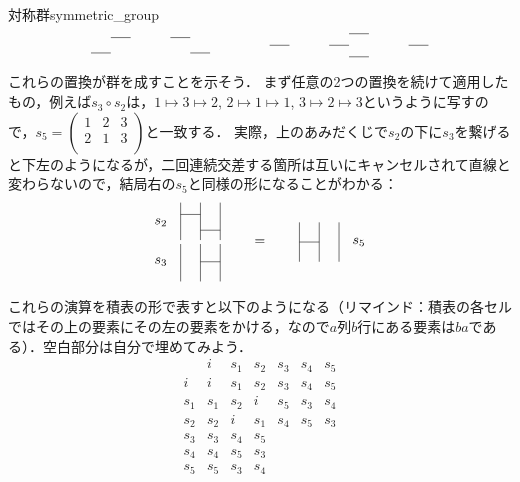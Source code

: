 \documentclass[11pt,a4paper, dvipdfmx]{jsarticle}
\begin{document}
\begin{rei}{対称群}{symmetric_group}
\[\begin{tikzpicture}
        \draw (0,.3) -- (.5,.3);
        \draw (.5,.7) -- (1,.7);
        \draw (2,.7) -- (2.5,.7);
        \draw (2.5,.3) -- (3,.3);
        \draw (4.5,.5) -- (5,.5);
        \draw (7,.8) -- (6.5,.8);
        \draw (6,.5) -- (6.5,.5);
        \draw (7,.2) -- (6.5,.2);
        \draw (8,.5) -- (8.5,.5);
    \end{tikzpicture}\]    

    これらの置換が群を成すことを示そう．
    まず任意の2つの置換を続けて適用したもの，例えば$s_3 \circ s_2$は，$1\mapsto3\mapsto2$, $2\mapsto1\mapsto1$, $3\mapsto2\mapsto3$というように写すので，$ s_5 = 
    \left( \begin{smallmatrix}
        1 & 2 & 3 \\
        2 & 1 & 3 \\
    \end{smallmatrix} \right)$と一致する．
    実際，上のあみだくじで$s_2$の下に$s_3$を繋げると下左のようになるが，二回連続交差する箇所は互いにキャンセルされて直線と変わらないので，結局右の$s_5$と同様の形になることがわかる：
    \[\begin{tikzpicture}
        \draw (0,0) -- (0,0.95);\draw (0,1.05) -- (0,2);
        \draw (.5,0) -- (.5,0.95);\draw (.5,1.05) -- (.5,2);
        \draw (1,0) -- (1,0.95);\draw (1,1.05) -- (1,2);

        \node (s2) at (-.5,1.5) {$s_2$};
        \node (s3) at (-.5,.5) {$s_3$};
        \draw (0,1.7) -- (.5,1.7);
        \draw (.5,1.3) -- (1,1.3);
        \draw (.5,.5) -- (1,.5);

        \node (eq) at (2,1) {$=$};

        \node (s5) at (4.5,1) {$s_5$};
        \draw (3,.5) -- (3,1.5);
        \draw (3.5,.5) -- (3.5,1.5);
        \draw (4,.5) -- (4,1.5);
        \draw (3,1) -- (3.5,1);
    \end{tikzpicture}\] 


    これらの演算を積表の形で表すと以下のようになる（リマインド：積表の各セルではその上の要素にその左の要素をかける，なので$a$列$b$行にある要素は$ba$である）．空白部分は自分で埋めてみよう．
    \[
        \begin{array}{c|cccccc}
               & i & s_1 & s_2 & s_3 & s_4 & s_5 \\ \hline
               i & i & s_1 & s_2 & s_3 & s_4 & s_5 \\ 
               s_1 & s_1 & s_2 & i &  s_5 & s_3 & s_4  \\ 
               s_2 & s_2 & i & s_1 &  s_4 & s_5 & s_3 \\ 
               s_3 & s_3 & s_4 & s_5 &  &  &  \\ 
               s_4 & s_4 & s_5 & s_3 & & &  \\ 
               s_5 & s_5 & s_3 & s_4 & &  &  \\ 
             

\end{array}\]
\end{rei}
\end{document}
